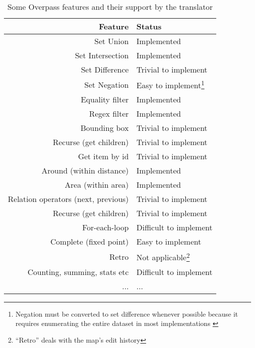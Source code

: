 \documentclass[main.tex]{subfiles}
\begin{document}
\begin{samepage}
\begin{table}[h]
    \begin{center}
        \begin{tabular}{|r|l|}
            \hline
            Feature & Status \\
            \hline
            Set Union & Implemented \\
            Set Intersection & Implemented \\
            Set Difference & Trivial to implement \\
            Set Negation & Easy to implement\footnote{
                Negation must be converted to set difference whenever possible
                because it requires enumerating the entire dataset in most
                implementations \cite{overpass}
            }    \\
            Equality filter & Implemented \\
            Regex filter & Implemented \\
            Bounding box & Trivial to implement \\
            Recurse (get children) & Trivial to implement \\
            Get item by id & Trivial to implement \\
            Around (within distance) & Implemented \\
            Area (within area) & Implemented \\
            Relation operators (next, previous) & Trivial to implement \\
            Recurse (get children) & Trivial to implement \\
            For-each-loop & Difficult to implement \\
            Complete (fixed point) & Easy to implement \\
            Retro & Not applicable\footnote{``Retro'' deals with the map's edit
                history} \\
            Counting, summing, stats etc & Difficult to implement \\
            ... & ... \\
            \hline
        \end{tabular}
    \end{center}
    \caption{Some Overpass features and their support by the translator}
    \label{table:overpassfeatures}
\end{table}
\end{samepage}
\end{document}
